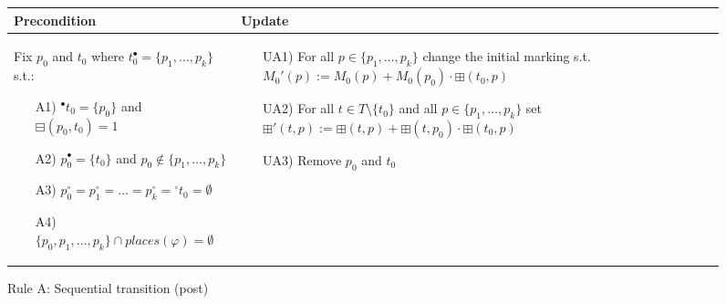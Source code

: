 \begin{figure}[h]
    \begin{adjustbox}{center}
        \begin{tabular}{|p{70mm}|p{62mm}|} \hline
        Precondition & Update \\ \hline
        Fix $p_0$ and $t_0$ where $t_0^\bullet=\{p_1,\dotsc,p_k\}$ s.t.:
        \begin{itemize}[leftmargin=10mm]
            \item[A1)] ${}^\bullet t_0=\{p_0\}$ and $\boxminus(p_0, t_0)=1$
            \item[A2)] $p_0^\bullet=\{t_0\}$ and $p_0\notin\{p_1,\dotsc,p_k\}$
            \item[A3)] $p_0^\circ=p_1^\circ=\dots=p_k^\circ={}^\circ t_0=\emptyset$
            \item[A4)] $\{p_0, p_1,\dotsc,p_k\}\cap places(\varphi)=\emptyset$
        \end{itemize} &
        \begin{itemize}[leftmargin=10mm]
            \item[UA1)] For all $p\in\{p_1,\dotsc,p_k\}$ change the initial marking s.t.\ $M_0'(p):=M_0(p)+M_0(p_0)\cdot\boxplus(t_0, p)$
            \item[UA2)] For all $t\in T\setminus\{t_0\}$ and all $p\in\{p_1,\dotsc,p_k\}$ set $\boxplus'(t,p):=\boxplus(t,p)+\boxplus(t,p_0)\cdot\boxplus(t_0,p)$
            \item[UA3)] Remove $p_0$ and $t_0$
        \end{itemize} \\ \hline
        \end{tabular}
    \end{adjustbox}
    \caption{Rule A: Sequential transition (post)}
    \label{fig:rule_a_post}
\end{figure}
